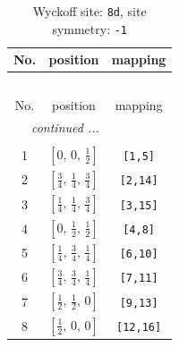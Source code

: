 \documentclass[fleqn,8pt]{jsarticle}
\begin{document}
\begin{longtable}{ccc}
\caption{Wyckoff site: {\tt 8d}, site symmetry: {\tt -1}}
 \\
 \hline \hline
No. & position & mapping \\ \hline \endfirsthead

\multicolumn{2}{l}{\tablename\ \thetable{}} \\
 \hline \hline
No. & position & mapping \\ \hline \endhead

 \hline \hline
\multicolumn{2}{r}{\footnotesize\it continued ...} \\ \endfoot

 \hline \hline
\multicolumn{2}{r}{} \\ \endlastfoot

1 & $\left[ 0,\, 0,\, \frac{1}{2} \right]$ & {\tt [1,5]} \\ \hline
2 & $\left[ \frac{3}{4},\, \frac{1}{4},\, \frac{3}{4} \right]$ & {\tt [2,14]} \\ \hline
3 & $\left[ \frac{1}{4},\, \frac{1}{4},\, \frac{3}{4} \right]$ & {\tt [3,15]} \\ \hline
4 & $\left[ 0,\, \frac{1}{2},\, \frac{1}{2} \right]$ & {\tt [4,8]} \\ \hline
5 & $\left[ \frac{1}{4},\, \frac{3}{4},\, \frac{1}{4} \right]$ & {\tt [6,10]} \\ \hline
6 & $\left[ \frac{3}{4},\, \frac{3}{4},\, \frac{1}{4} \right]$ & {\tt [7,11]} \\ \hline
7 & $\left[ \frac{1}{2},\, \frac{1}{2},\, 0 \right]$ & {\tt [9,13]} \\ \hline
8 & $\left[ \frac{1}{2},\, 0,\, 0 \right]$ & {\tt [12,16]} \\
\end{longtable}
\renewcommand{\arraystretch}{1.2}
\end{document}
